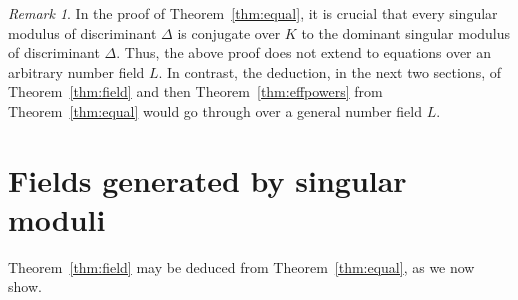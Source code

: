\documentclass[11pt,a4paper, british]{amsart}
\theoremstyle{definition}
\theoremstyle{remark}
\newtheorem{remark}[thm]{Remark}
\numberwithin{equation}{section}
\begin{document}
	\begin{remark}\label{rmk:q}
		In the proof of Theorem~\ref{thm:equal}, it is crucial that every singular modulus of discriminant $\Delta$ is conjugate over $K$ to the dominant singular modulus of discriminant $\Delta$. Thus, the above proof does not extend to equations over an arbitrary number field $L$. In contrast, the deduction, in the next two sections, of Theorem~\ref{thm:field} and then Theorem~\ref{thm:effpowers} from Theorem~\ref{thm:equal} would go through over a general number field $L$.
	\end{remark}
	
	\section{Fields generated by singular moduli}\label{sec:fields}
	
Theorem~\ref{thm:field} may be deduced from Theorem~\ref{thm:equal}, as we now show.
\end{document}
